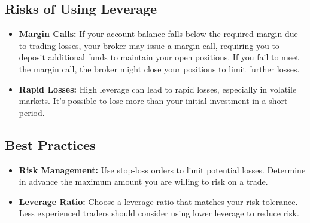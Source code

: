 \documentclass{report}
\begin{document}
     \bigbreak \noindent 
     \subsection{Risks of Using Leverage}
     \begin{itemize}
         \item \textbf{Margin Calls:} If your account balance falls below the required margin due to trading losses, your broker may issue a margin call, requiring you to deposit additional funds to maintain your open positions. If you fail to meet the margin call, the broker might close your positions to limit further losses.
         \item \textbf{Rapid Losses:} High leverage can lead to rapid losses, especially in volatile markets. It's possible to lose more than your initial investment in a short period.
     \end{itemize}

     \bigbreak \noindent 
     \subsection{Best Practices}
     \begin{itemize}
         \item \textbf{Risk Management:} Use stop-loss orders to limit potential losses. Determine in advance the maximum amount you are willing to risk on a trade.
         \item \textbf{Leverage Ratio:} Choose a leverage ratio that matches your risk tolerance. Less experienced traders should consider using lower leverage to reduce risk.
     \end{itemize}

     \pagebreak 

     \pagebreak 
\end{document}
